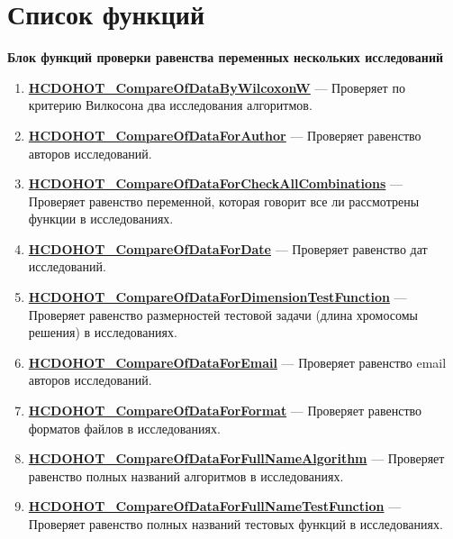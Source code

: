 \documentclass[a4paper,12pt]{article}
\begin{document}
\section{Список функций}\label{section_listfunctions}
\textbf{Блок функций проверки равенства переменных нескольких исследований}
\begin{enumerate}
	
	\item \textbf{\hyperref[HCDOHOT_CompareOfDataByWilcoxonW]{HCDOHOT\_CompareOfDataByWilcoxonW}} --- Проверяет по критерию Вилкосона два исследования алгоритмов.
	
	\item \textbf{\hyperref[HCDOHOT_CompareOfDataForAuthor]{HCDOHOT\_CompareOfDataForAuthor}} --- Проверяет равенство авторов исследований.
	
	\item \textbf{\hyperref[HCDOHOT_CompareOfDataForCheckAllCombinations]{HCDOHOT\_CompareOfDataForCheckAllCombinations}} --- Проверяет равенство переменной, которая говорит все ли рассмотрены функции в исследованиях.
	
	\item \textbf{\hyperref[HCDOHOT_CompareOfDataForDate]{HCDOHOT\_CompareOfDataForDate}} --- Проверяет равенство дат исследований.
	
	\item \textbf{\hyperref[HCDOHOT_CompareOfDataForDimensionTestFunction]{HCDOHOT\_CompareOfDataForDimensionTestFunction}} --- Проверяет равенство размерностей тестовой задачи (длина хромосомы решения) в исследованиях.
	
	\item \textbf{\hyperref[HCDOHOT_CompareOfDataForEmail]{HCDOHOT\_CompareOfDataForEmail}} --- Проверяет равенство email авторов исследований.
	
	\item \textbf{\hyperref[HCDOHOT_CompareOfDataForFormat]{HCDOHOT\_CompareOfDataForFormat}} --- Проверяет равенство форматов файлов в исследованиях.
	
	\item \textbf{\hyperref[HCDOHOT_CompareOfDataForFullNameAlgorithm]{HCDOHOT\_CompareOfDataForFullNameAlgorithm}} --- Проверяет равенство полных названий алгоритмов в исследованиях.
	
	\item \textbf{\hyperref[HCDOHOT_CompareOfDataForFullNameTestFunction]{HCDOHOT\_CompareOfDataForFullNameTestFunction}} --- Проверяет равенство полных названий тестовых функций в исследованиях.
	

\end{enumerate}
\end{document}
